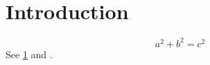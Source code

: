 \documentclass{article}
\begin{document}
\section{Introduction}\label{sec:intro}

\begin{equation}\label{eq:main}
  a^2 + b^2 = c^2
\end{equation}
See \ref{sec:intro} and \cite{he2022mae}.


\end{document}
